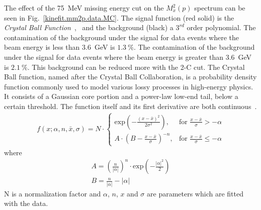 The effect of the 75~MeV missing energy cut on the $M_x^2(p)$ spectrum can be seen in Fig.~\ref{kinefit.mm2p.data.MC}. The signal function (red solid) is the \emph{Crystal Ball Function}~\cite{CBwiki},~\cite{CBjlab} and the background (black) a $3^{rd}$ order polynomial. The contamination of the background under the \pizT signal for data events where the beam energy is less than 3.6~GeV is $1.3~\%$. The contamination of the background under the \pizT signal for data events where the beam energy is greater than 3.6~GeV is $2.1~\%$. This background can be reduced more with the 2-C cut. 
The Crystal Ball function, named after the Crystal Ball Collaboration, is a probability density function commonly used to model various lossy processes in high-energy physics. It consists of a Gaussian core portion and a power-law low-end tail, below a certain threshold. The function itself and its first derivative are both continuous~\cite{CBjlab}. 
\begin{align}
f(x;\alpha,n,\bar{x},\sigma)=N\cdot
\begin{cases}
\mathrm{exp}(-\frac{(x-\bar{x})^2}{2 \sigma^2}), & \text{for }\frac{x-\bar{x}}{\sigma}>-\alpha \\
A \cdot (B - \frac{x-\bar{x}}{\sigma})^{-n}, & \text{for }\frac{x-\bar{x}}{\sigma} \le -\alpha
\end{cases}
\end{align}
where
\begin{align}
A = \left( \frac{n}{\left| \alpha \right|}\right)^n \cdot \mathrm{exp} \left( - \frac{\left| \alpha \right|^2}{2}\right) \nonumber  \\
B=\frac{n}{\left| \alpha \right|} - \left| \alpha \right|
\end{align}
N is a normalization factor and $\alpha$, $n$, $x$ and $\sigma$ are parameters which are fitted with the data.
